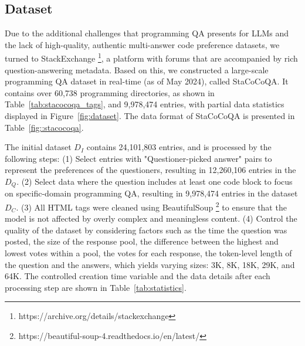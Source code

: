 \subsection{Dataset}


Due to the additional challenges that programming QA presents for LLMs and the lack of high-quality, authentic multi-answer code preference datasets, we turned to StackExchange \footnote{https://archive.org/details/stackexchange}, a platform with forums that are accompanied by rich question-answering metadata. Based on this, we constructed a large-scale programming QA dataset in real-time (as of May 2024), called StaCoCoQA. It contains over 60,738 programming directories, as shown in Table~\ref{tab:stacocoqa_tags}, and 9,978,474 entries, with partial data statistics displayed in Figure~\ref{fig:dataset}. The data format of StaCoCoQA is presented in Table~\ref{fig::stacocoqa}.

The initial dataset \(D_I\) contains 24,101,803 entries, and is processed by the following steps:
(1) Select entries with "Questioner-picked answer" pairs to represent the preferences of the questioners, resulting in 12,260,106 entries in the \(D_Q\).
(2) Select data where the question includes at least one code block to focus on specific-domain programming QA, resulting in 9,978,474 entries in the dataset \(D_C\).
(3) All HTML tags were cleaned using BeautifulSoup \footnote{https://beautiful-soup-4.readthedocs.io/en/latest/} to ensure that the model is not affected by overly complex and meaningless content.
(4) Control the quality of the dataset by considering factors such as the time the question was posted, the size of the response pool, the difference between the highest and lowest votes within a pool, the votes for each response, the token-level length of the question and the answers, which yields varying sizes: 3K, 8K, 18K, 29K, and 64K. 
The controlled creation time variable and the data details after each processing step are shown in Table~\ref{tab:statistics}.

